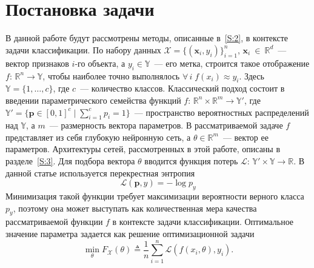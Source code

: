 \documentclass[preprint,12pt]{elsarticle}
\begin{document}
{\section{Постановка задачи}
\label{S:1}
В данной работе будут рассмотрены методы, описанные в~\ref{S:2}, в контексте задачи классификации. По набору данных $\mathcal{X} = \{(\mathbf{x}_i, y_i)\}_{i=1}^n$, $\mathbf{x}_i~\in~\mathbb{R}^d$~--- вектор признаков $i$-го объекта, а $y_i \in \mathbb{Y}$~--- его метка, строится такое отображение $f\colon \, \mathbb{R}^n \rightarrow \mathbb{Y}$, чтобы наиболее точно выполнялось $\forall\, i \; f(x_i) \approx y_i$. 
Здесь $\mathbb{Y} = \{1, \dots, c\}$, где $c$~--- количество классов. 
Классический подход состоит в введении параметрического семейства функций $f\colon \, \mathbb{R}^n \times \mathbb{R}^m \rightarrow \mathbb{Y}'$, где $\mathbb{Y}' = \{\mathbf{p} \in [0, 1]^c \mid \sum_{i=1}^c p_i = 1\}$~--- пространство вероятностных распределений над $\mathbb{Y}$, а $m$~--- размерность вектора параметров. 
В рассматриваемой задаче $f$ представляет из себя глубокую нейронную сеть, а $\theta \in \mathbb{R}^m$~--- вектор ее параметров. Архитектуры сетей, рассмотренных в этой работе, описаны в разделе~\ref{S:3}.
Для подбора вектора $\theta$ вводится функция потерь $\mathcal{L}\colon \, \mathbb{Y}' \times \mathbb{Y} \rightarrow \mathbb{R}$. В данной статье используется перекрестная энтропия
\begin{equation} \label{eq-crossentropy}
    \mathcal{L}(\mathbf{p}, y) = -\log p_y
\end{equation}
Минимизация такой функции требует максимизации вероятности верного класса $p_y$, поэтому она может выступать как количественная мера качества рассматриваемой функции $f$ в контексте задачи классификации.
Оптимальное значение параметра задается как решение оптимизационной задачи
\begin{equation} \label{eq-opt-weight}
    \min_\theta F_\mathcal{X}(\theta) \triangleq \frac1n \sum_{i=1}^n \mathcal{L}(f(x_i, \theta), y_i).
\end{equation}

}
\end{document}
